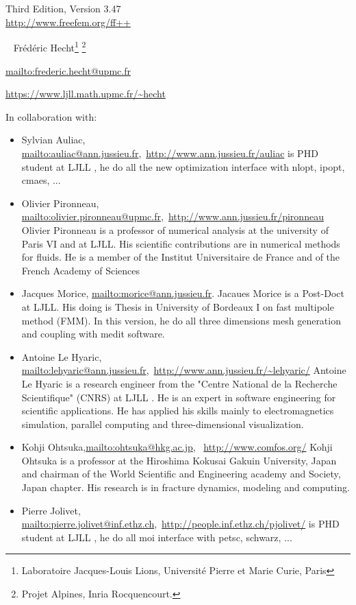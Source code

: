 \documentclass[a4paper,twoside,12pt]{book}
\def\VERSION{3.47}
\begin{document}
\begin{center}
 {} \\ \vglue 0.0cm  ~ \\
   Third Edition, Version \VERSION
 \\ \vglue 0.7cm
 {\Large \url{http://www.freefem.org/ff++}} \\
\vglue 0.5cm

 \
{ Fr\'{e}d\'{e}ric Hecht\footnote{Laboratoire Jacques-Louis Lions, Universit\'{e} Pierre et Marie Curie, Paris}
\footnote{Projet Alpines, Inria Rocquencourt.} }

\url{mailto:frederic.hecht@upmc.fr}

\url{https://www.ljll.math.upmc.fr/~hecht}


\bigskip

In collaboration with:
{\small
\begin{itemize}
\item {\normalsize Sylvian Auliac}, \url{mailto:auliac@ann.jussieu.fr},~\url{http://www.ann.jussieu.fr/auliac}
{is PHD student at LJLL  , he do all the new optimization interface with nlopt, ipopt, cmaes, ...}

\item {\normalsize Olivier Pironneau}, \url{mailto:olivier.pironneau@upmc.fr},~\url{http://www.ann.jussieu.fr/pironneau}
{Olivier Pironneau is a professor of numerical analysis at the university of Paris VI and at LJLL.  His scientific contributions are in numerical methods for fluids.  He is a member of the Institut Universitaire de France and of the French  Academy of Sciences}
\item {\normalsize Jacques Morice}, \url{mailto:morice@ann.jussieu.fr}.
Jacaues Morice is a Post-Doct at LJLL. His doing is Thesis in University of Bordeaux I on fast multipole method (FMM).
In this version, he do all three dimensions mesh generation and coupling with medit software.
\item {\normalsize Antoine Le Hyaric}, \url{mailto:lehyaric@ann.jussieu.fr},~\url{http://www.ann.jussieu.fr/~lehyaric/}
{Antoine Le Hyaric}{ is a research engineer  from the "Centre National de la
Recherche Scientifique" (CNRS) at LJLL . He is an expert in software engineering
for scientific applications. He has applied his skills mainly to
electromagnetics simulation, parallel computing and three-dimensional
visualization.}
\item {\normalsize Kohji Ohtsuka},\url{mailto:ohtsuka@hkg.ac.jp},~ \url{http://www.comfos.org/}
{Kohji Ohtsuka}{ is a professor at the Hiroshima Kokusai Gakuin University, Japan and chairman of the World Scientific and Engineering academy and Society, Japan chapter.  His research is in fracture dynamics, modeling and computing.}
\item {\normalsize Pierre  Jolivet}, \url{mailto:pierre.jolivet@inf.ethz.ch},~\url{http://people.inf.ethz.ch/pjolivet/}
{is PHD student at LJLL , he do all moi interface with   petsc, schwarz, ... }

\end{itemize}}
\end{center}
\end{document}
